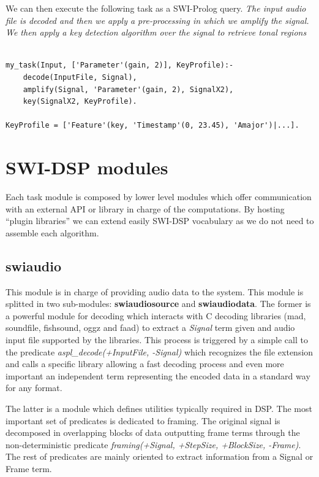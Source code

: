 \documentclass[runningheads]{llncs}
\begin{document}
We can then execute the following task as a SWI-Prolog query. \textit{The input audio file is decoded and then we apply a pre-processing in which we amplify the signal. We then apply a key detection algorithm over the signal to retrieve tonal regions}

\begin{verbatim}
 
my_task(Input, ['Parameter'(gain, 2)], KeyProfile):-
	decode(InputFile, Signal),
	amplify(Signal, 'Parameter'(gain, 2), SignalX2),
	key(SignalX2, KeyProfile).

KeyProfile = ['Feature'(key, 'Timestamp'(0, 23.45), 'Amajor')|...].	

\end{verbatim}

\section{SWI-DSP modules}\label{sec:modules}

Each task module is composed by lower level modules which offer communication with an external API or library in charge of the computations. By hosting ``plugin libraries'' we can extend easily SWI-DSP vocabulary as we do not need to assemble each algorithm.

\subsection{swiaudio}\label{subsec:swiaudio}

This module is in charge of providing audio data to the system. This module is splitted in two sub-modules: \textbf{swiaudiosource} and \textbf{swiaudiodata}. The former is a powerful module for decoding which interacts with C decoding libraries (mad, soundfile, fishsound, oggz and faad) to extract a \textit{Signal} term given and audio input file supported by the libraries. This process is triggered by a simple call to the predicate \textit{aspl\_decode(+InputFile, -Signal)} which recognizes the file extension and calls a specific library allowing a fast decoding process and even more important an independent term representing the encoded data in a standard way for any format.

The latter is a module which defines utilities typically required in DSP. The most important set of predicates is dedicated to framing. The original signal is decomposed in overlapping blocks of data outputting frame terms through the non-deterministic predicate \textit{framing(+Signal, +StepSize, +BlockSize, -Frame)}. The rest of predicates are mainly oriented to extract information from a Signal or Frame term.
 
\end{document}

